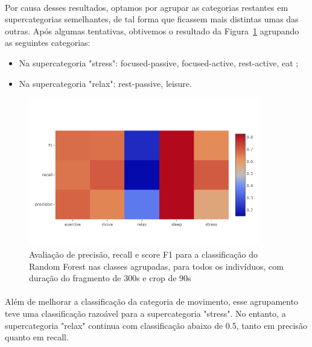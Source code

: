             \paragraph{} Por causa desses resultados, optamos por agrupar as categorias restantes em supercategorias semelhantes, de tal forma que ficassem mais distintas umas das outras. Após algumas tentativas, obtivemos o resultado da Figura~\ref{group2} agrupando as seguintes categorias:
            \begin{itemize} 
                \item Na supercategoria "stress": focused-passive, focused-active, rest-active, eat ;
                \item Na supercategoria "relax": rest-passive, leisure.
            \end{itemize}
            
            \begin{figure}[htb!]
            	\centering
            	\includegraphics[width=0.9\textwidth]{Figures/classif/class_group2.png}
            	\caption{Avaliação de precisão, recall e score F1 para a classificação do Random Forest nas classes agrupadas, para todos os indivíduos, com duração do fragmento de  300s e crop de 90s}
                \label{group2}
            \end{figure}
            
            \paragraph{} Além de melhorar a classificação da categoria de movimento, esse agrupamento teve uma classificação razoável para a supercategoria "stress". No entanto, a supercategoria "relax" continua com classificação abaixo de 0.5, tanto em precisão quanto em recall. 
            
